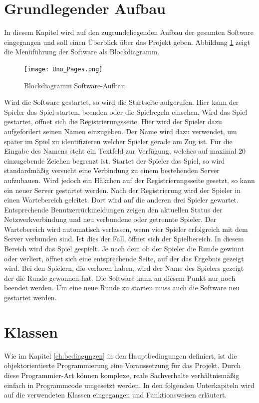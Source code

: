 \section{Grundlegender Aufbau}
In diesem Kapitel wird auf den zugrundeliegenden Aufbau der gesamten Software eingegangen und soll einen Überblick über das Projekt geben. Abbildung \ref{fig:aufbau} zeigt die Menüführung der Software als Blockdiagramm. 
\begin{figure}[h]
	\begin{center}
		\texttt{[image: Uno\_Pages.png]}
		\caption{Blockdiagramm Software-Aufbau}
		\label{fig:aufbau}
	\end{center}
\end{figure}
Wird die Software gestartet, so wird die Startseite aufgerufen. Hier kann der Spieler das Spiel starten, beenden oder die Spielregeln einsehen. Wird das Spiel gestartet, öffnet sich die Registrierungsseite. Hier wird der Spieler dazu aufgefordert seinen Namen einzugeben. Der Name wird dazu verwendet, um später im Spiel zu identifizieren welcher Spieler gerade am Zug ist. Für die Eingabe des Namens steht ein Textfeld zur Verfügung, welches auf maximal 20 einzugebende Zeichen begrenzt ist. Startet der Spieler das Spiel, so wird standardmäßig versucht eine Verbindung zu einem bestehenden Server aufzubauen. Wird jedoch ein Häkchen auf der Registrierungsseite gesetzt, so kann ein neuer Server gestartet werden. Nach der Registrierung wird der Spieler in einen Wartebereich geleitet. Dort wird auf die anderen drei Spieler gewartet. Entsprechende Benutzerrückmeldungen zeigen den aktuellen Status der Netzwerkverbindung und neu verbundene oder getrennte Spieler. Der Wartebereich wird automatisch verlassen, wenn vier Spieler erfolgreich mit dem Server verbunden sind. Ist dies der Fall, öffnet sich der Spielbereich. In diesem Bereich wird das Spiel gespielt. Je nach dem ob der Spieler die Runde gewinnt oder verliert, öffnet sich eine entsprechende Seite, auf der das Ergebnis gezeigt wird. Bei den Spielern, die verloren haben, wird der Name des Spielers gezeigt der die Runde gewonnen hat. Die Software kann an diesem Punkt nur noch beendet werden. Um eine neue Runde zu starten muss auch die Software neu gestartet werden.
\section{Klassen}
Wie im Kapitel \ref{ch:bedingungen} in den Hauptbedingungen definiert, ist die objektorientierte Programmierung eine Voraussetzung für das Projekt. Durch diese Programmier-Art können komplexe, reale Sachverhalte verhältnismäßig einfach in Programmcode umgesetzt werden. In den folgenden Unterkapiteln wird auf die verwendeten Klassen eingegangen und Funktionsweisen erläutert.
